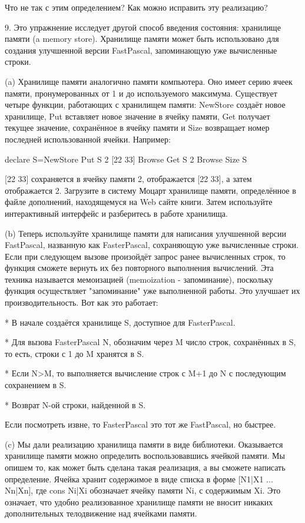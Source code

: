 Что не так с этим определением? Как можно исправить эту реализацию?

9. Это упражнение исследует другой способ введения состояния: хранилище памяти (a memory store). Хранилище памяти может быть использовано для создания улучшенной версии FastPascal, запоминающую уже вычисленные строки.

(a) Хранилище памяти аналогично памяти компьютера. Оно имеет серию ячеек памяти, пронумерованных от 1 и до используемого максимума. Существует четыре функции, работающих с хранилищем памяти: NewStore создаёт новое хранилище, Put вставляет новое значение в ячейку памяти, Get получает текущее значение, сохранённое в ячейку памяти и Size возвращает номер последней использованной ячейки. Например:

declare
S={NewStore}
{Put S 2 [22 33]}
{Browse {Get S 2}}
{Browse {Size S}}

[22 33] сохраняется в ячейку памяти 2, отображается [22 33], а затем отображается 2. Загрузите в систему Моцарт хранилище памяти, определённое в файле дополнений, находящемуся на Web сайте книги. Затем используйте интерактивный интерфейс и разберитесь в работе хранилища.

(b) Теперь используйте хранилище памяти для написания улучшенной версии FastPascal, названную как FasterPascal, сохраняющую уже вычисленные строки. Если при следующем вызове произойдёт запрос ранее вычисленных строк, то функция сможете вернуть их без повторного выполнения вычислений. Эта техника называется мемоизацией (memoization - запоминание), поскольку функция осуществляет "запоминание" уже выполненной работы. Это улучшает их производительность. Вот как это работает:

* В начале создаётся хранилище S, доступное для FasterPascal.

* Для вызова {FasterPascal N}, обозначим через M число строк, сохранённых в S, то есть, строки с 1 до M хранятся в S.

* Если N>M, то выполняется вычисление строк с M+1 до N с последующим сохранением в S.

* Возврат N-ой строки, найденной в S.

Если посмотреть извне, то FasterPascal это тот же FastPascal, но быстрее.

(c) Мы дали реализацию хранилища памяти в виде библиотеки. Оказывается хранилище памяти можно определить воспользовавшись ячейкой памяти. Мы опишем то, как может быть сделана такая реализация, а вы сможете написать определение. Ячейка хранит содержимое в виде списка в форме [N1|X1 ... Nn|Xn], где cons Ni|Xi обозначает ячейку памяти Ni, с содержимым Xi. Это означает, что удобно реализованное хранилище памяти не вносит никаких дополнительных телодвижение над ячейками памяти.

